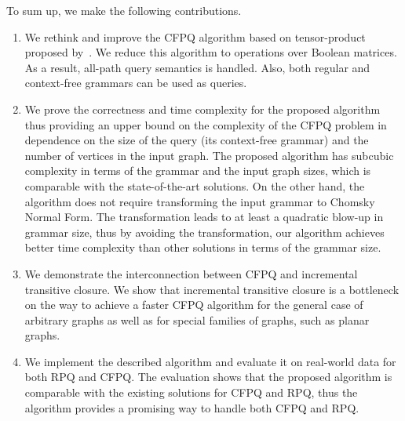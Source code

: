 To sum up, we make the following contributions.
\begin{enumerate}
	\item We rethink and improve the CFPQ algorithm based on tensor-product proposed by~\cite{10.1007/978-3-030-54832-2_6}.
	We reduce this algorithm to operations over Boolean matrices.
	As a result, all-path query semantics is handled. Also, both regular and context-free grammars can be used as queries.
	\item
	We prove the correctness and time complexity for the proposed algorithm thus providing an upper bound on the complexity of the CFPQ problem in dependence on the size of the query (its context-free grammar) and the number of vertices in the input graph.
	The proposed algorithm has subcubic complexity in terms of the grammar and the input graph sizes, which is comparable with the state-of-the-art solutions.
	On the other hand, the algorithm does not require transforming the input grammar to Chomsky Normal Form.
	The transformation leads to at least a quadratic blow-up in grammar size, thus by avoiding the transformation, our algorithm achieves better time complexity   than other solutions in terms of the grammar size.
	\item We demonstrate the interconnection between CFPQ and incremental transitive closure.
	We show that incremental transitive closure is a bottleneck on the way to achieve a faster CFPQ algorithm for the general case of arbitrary graphs as well as for special families of graphs, such as planar graphs.
	\item We implement the described algorithm and evaluate it on real-world data for both RPQ and CFPQ.
	The evaluation shows that the proposed algorithm is comparable with the existing solutions for CFPQ and RPQ, thus the algorithm provides a promising way to handle both CFPQ and RPQ.
\end{enumerate}